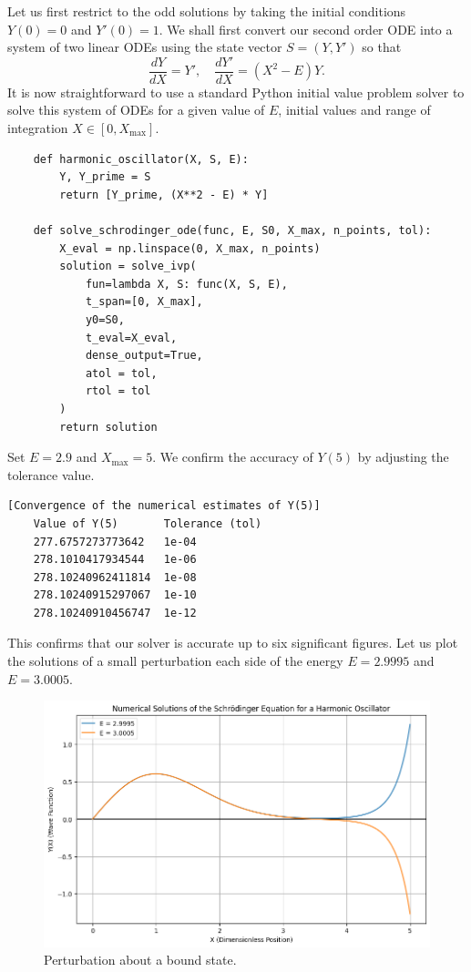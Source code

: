 \documentclass{article}
\begin{document}
Let us first restrict to the odd solutions by taking the initial conditions \(Y(0) = 0\) and \(Y'(0) = 1\). We shall first convert our second order ODE into a system of two linear ODEs using the state vector \(S = (Y, Y')\) so that
\[ \frac{dY}{dX} = Y', \quad \frac{dY'}{dX} = (X^2- E)Y. \]
It is now straightforward to use a standard Python initial value problem solver to solve this system of ODEs for a given value of \(E\), initial values and range of integration \(X \in [0, X_{\max}]\).

\begin{verbatim}
    def harmonic_oscillator(X, S, E):
        Y, Y_prime = S
        return [Y_prime, (X**2 - E) * Y]
    
    def solve_schrodinger_ode(func, E, S0, X_max, n_points, tol):
        X_eval = np.linspace(0, X_max, n_points)
        solution = solve_ivp(
            fun=lambda X, S: func(X, S, E),
            t_span=[0, X_max],
            y0=S0,
            t_eval=X_eval,
            dense_output=True,
            atol = tol,
            rtol = tol
        )
        return solution
\end{verbatim}

Set \(E = 2.9\) and \(X_{\max} = 5\). We confirm the accuracy of \(Y(5)\) by adjusting the tolerance value.
\begin{verbatim}[Convergence of the numerical estimates of Y(5)]
    Value of Y(5)       Tolerance (tol)
    277.6757273773642   1e-04
    278.1010417934544   1e-06
    278.10240962411814  1e-08
    278.10240915297067  1e-10
    278.10240910456747  1e-12
\end{verbatim}

This confirms that our solver is accurate up to six significant figures. Let us plot the solutions of a small perturbation each side of the energy \(E = 2.9995\) and \(E = 3.0005\).

\begin{figure}
    \centering
    \includegraphics[width=1\linewidth]{images/harmonic_1.png}
    \caption{Perturbation about a bound state.}
\end{figure}
\end{document}
